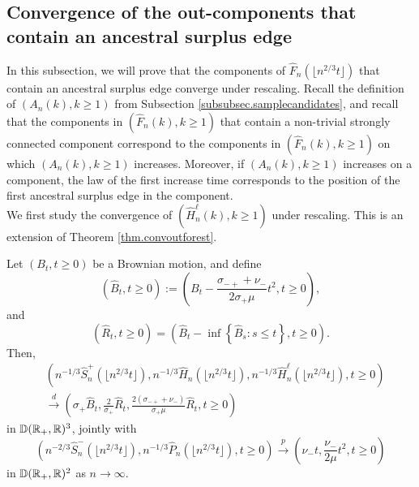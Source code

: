 \subsection{Convergence of the out-components that contain an ancestral surplus edge}\label{subsec.ancestral}
In this subsection, we will prove that the components of $\hat{F}_n\left(\lfloor n^{2/3}t\rfloor\right)$ that contain an ancestral surplus edge converge under rescaling. Recall the definition of $(A_n(k),k\geq 1)$ from Subsection \ref{subsubsec.samplecandidates}, and recall that the components in $(\hat{F}_n(k),k\geq 1)$ that contain a non-trivial strongly connected component correspond to the components in $(\hat{F}_n(k),k\geq 1)$ on which $(A_n(k),k\geq 1)$ increases. Moreover, if $(A_n(k),k\geq 1)$ increases on a component, the law of the first increase time corresponds to the position of the first ancestral surplus edge in the component. \\
We first study the convergence of $(\hat{H}_n^\ell(k),k\geq 1)$ under rescaling. This is an extension of Theorem \ref{thm.convoutforest}.
\begin{lemma}\label{lemma.heightprocesswithlengths}
Let $(B_t, t\geq 0)$ be a Brownian motion, and define
$$(\hat{B}_t,t\geq 0):=\left( B_t-\frac{\sigma_{-+}+\nu_-}{2\sigma_+ \mu}t^2, t\geq 0\right),$$ and $$(\hat{R}_t,t\geq 0)=\left(\hat{B}_t-\inf\left\{\hat{B}_s: s\leq t\right\},t\geq 0\right).$$ 
Then,
\begin{align*}&\left(n^{-1/3}\hat{S}^{+}_n\left(\lfloor n^{2/3}t\rfloor \right),n^{-1/3}\hat{H}_{n}\left(\lfloor n^{2/3}t\rfloor \right),n^{-1/3}\hat{H}^\ell_{n}\left(\lfloor n^{2/3}t\rfloor \right),  t\geq 0\right)\\
&\overset{d}{\to}\left(\sigma_+ \hat{B}_t, \frac{2}{\sigma_+} \hat{R}_t,\frac{2(\sigma_{-+}+\nu_-)}{\sigma_+\mu} \hat{R}_t, t\geq 0\right)\end{align*}
in ${\mathbb D}({\mathbb R}_+,{\mathbb R})^3$,
jointly with 
$$\left(n^{-2/3}\hat{S}_n^-\left(\lfloor n^{2/3}t\rfloor \right), n^{-1/3}\hat{P}_n\left(\lfloor n^{2/3}t\rfloor \right),t\geq 0\right)\overset{p}{\to}\left(\nu_-t,  \frac{\nu_-}{2\mu} t^2, t\geq 0\right)$$
in ${\mathbb D}({\mathbb R}_+,{\mathbb R})^2$ as $n\to \infty$.
\end{lemma}
